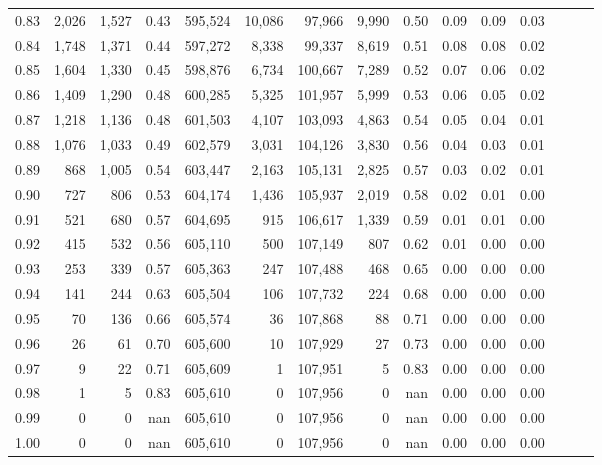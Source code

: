 \begin{tabular}{rrrrrrrrrrrrrrr}
0.83 &   2,026 &  1,527 &  0.43 &  595,524 &   10,086 &   97,966 &    9,990 &  0.50 &  0.09 &  0.09 &      0.03 \\
0.84 &   1,748 &  1,371 &  0.44 &  597,272 &    8,338 &   99,337 &    8,619 &  0.51 &  0.08 &  0.08 &      0.02 \\
0.85 &   1,604 &  1,330 &  0.45 &  598,876 &    6,734 &  100,667 &    7,289 &  0.52 &  0.07 &  0.06 &      0.02 \\
0.86 &   1,409 &  1,290 &  0.48 &  600,285 &    5,325 &  101,957 &    5,999 &  0.53 &  0.06 &  0.05 &      0.02 \\
0.87 &   1,218 &  1,136 &  0.48 &  601,503 &    4,107 &  103,093 &    4,863 &  0.54 &  0.05 &  0.04 &      0.01 \\
0.88 &   1,076 &  1,033 &  0.49 &  602,579 &    3,031 &  104,126 &    3,830 &  0.56 &  0.04 &  0.03 &      0.01 \\
0.89 &     868 &  1,005 &  0.54 &  603,447 &    2,163 &  105,131 &    2,825 &  0.57 &  0.03 &  0.02 &      0.01 \\
0.90 &     727 &    806 &  0.53 &  604,174 &    1,436 &  105,937 &    2,019 &  0.58 &  0.02 &  0.01 &      0.00 \\
0.91 &     521 &    680 &  0.57 &  604,695 &      915 &  106,617 &    1,339 &  0.59 &  0.01 &  0.01 &      0.00 \\
0.92 &     415 &    532 &  0.56 &  605,110 &      500 &  107,149 &      807 &  0.62 &  0.01 &  0.00 &      0.00 \\
0.93 &     253 &    339 &  0.57 &  605,363 &      247 &  107,488 &      468 &  0.65 &  0.00 &  0.00 &      0.00 \\
0.94 &     141 &    244 &  0.63 &  605,504 &      106 &  107,732 &      224 &  0.68 &  0.00 &  0.00 &      0.00 \\
0.95 &      70 &    136 &  0.66 &  605,574 &       36 &  107,868 &       88 &  0.71 &  0.00 &  0.00 &      0.00 \\
0.96 &      26 &     61 &  0.70 &  605,600 &       10 &  107,929 &       27 &  0.73 &  0.00 &  0.00 &      0.00 \\
0.97 &       9 &     22 &  0.71 &  605,609 &        1 &  107,951 &        5 &  0.83 &  0.00 &  0.00 &      0.00 \\
0.98 &       1 &      5 &  0.83 &  605,610 &        0 &  107,956 &        0 &   nan &  0.00 &  0.00 &      0.00 \\
0.99 &       0 &      0 &   nan &  605,610 &        0 &  107,956 &        0 &   nan &  0.00 &  0.00 &      0.00 \\
1.00 &       0 &      0 &   nan &  605,610 &        0 &  107,956 &        0 &   nan &  0.00 &  0.00 &      0.00 \\
\bottomrule
\end{tabular}
